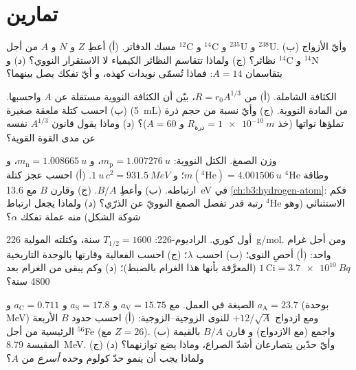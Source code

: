 \section{تمارين}

\begin{exercise}[$\star$]\label{exo:b3:nuclear-physics:1}
مسك الدفاتر. (أ) أعطِ $Z$ و $N$ و $A$ من أجل $^{12}$C و $^{14}$C
و $^{235}$U و $^{238}$U. (ب) وأيّ الأزواج نظائر؟ (ج) ولماذا
تتقاسم النظائر الكيمياء لا الاستقرار النووي؟ (د) و $^{14}$C
و $^{14}$N يتقاسمان $A = 14$: فماذا تُسمّى نويدات كهذه، و
أيّ تفكك يصل بينهما؟
\end{exercise}

\begin{exercise}[$\star$]\label{exo:b3:nuclear-physics:2}
الكثافة الشاملة. (أ) من $R = r_0A^{1/3}$، بيّن أن
الكثافة النووية مستقلة عن $A$ واحسبها. (ب)
احسب كتلة ملعقة صغيرة (\qty{5}{mL}) من المادة النووية.
(ج) وأيّ نسبة من حجم ذرة تملؤها نواتها (خذ
$R_{\text{ذرة}} = \qty{1e-10}{m}$ و $A = 60$)؟ (د) وماذا يقول
قانون $A^{1/3}$ نفسه عن مدى القوة القوية؟
\end{exercise}

\begin{exercise}[$\star$]\label{exo:b3:nuclear-physics:3}
وزن الصمغ. الكتل النووية: $m_{\text{p}} =
\qty{1.007276}{u}$، و $m_{\text{n}} = \qty{1.008665}{u}$، و
$m(^4\text{He}) = \qty{4.001506}{u}$؛ و
$\qty{1}{u}\,c^2 = \qty{931.5}{MeV}$. (أ) احسب عجز كتلة
$^4$He وطاقة ارتباطه. (ب) وأعطِ $B/A$. (ج) وقارن $B$ مع
\qty{13.6}{eV} في \cref{ch:b3:hydrogen-atom}: فكم رتبة
قدر تفصل الصمغ النوويّ عن الذرّي؟ (د) ولماذا يجعل
ارتباط $^4$He الاستثنائي (وهو شوكة الشكل) منه عملة تفكك $\alpha$؟
\end{exercise}

\begin{exercise}[$\star$]\label{exo:b3:nuclear-physics:4}
أول كوري. الراديوم-226: $T_{1/2} = 1600$ سنة، وكتلته المولية
\qty{226}{g/mol}. ومن أجل غرام واحد: (أ) أحصِ النوى؛ (ب) احسب
$\lambda$؛ (ج) احسب الفعالية وقارنها بالوحدة التاريخية
$1\,\text{Ci} = \qty{3.7e10}{Bq}$ (المعرَّفة بأنها هذا الغرام
بالضبط)؛ (د) وكم يبقى من الغرام بعد 4800 سنة؟
\end{exercise}

\begin{exercise}[$\star\star$]\label{exo:b3:nuclear-physics:5}
الصيغة في العمل. مع $a_{\text{V}} = 15.75$ و
$a_{\text{S}} = 17.8$ و $a_{\text{C}} = 0.711$ و
$a_{\text{A}} = 23.7$ (بوحدة \unit{MeV}) ومع ازدواج
$+12/\sqrt A$ للنوى الزوجية--الزوجية: (أ) احسب حدود $B$ الأربعة
الرئيسية من أجل $^{56}$Fe (مع $Z = 26$). (ب) واجمع (مع الازدواج) و
قارن $B/A$ بالقيمة المقيسة \qty{8.79}{MeV}. (ج) وأيّ حدّين
يتصارعان أشدّ الصراع، وماذا يضع توازنهما؟ (د) ولماذا
يجب أن ينمو حدّ كولوم وحده \emph{أسرع} من $A$؟
\end{exercise}

